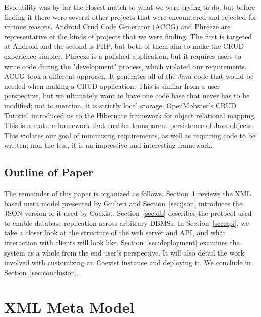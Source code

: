 \documentclass[journal]{IEEEtran}
\begin{document}
Evolutility\cite{giulieri_evolutility_????} was by far the closest match to what we were trying to do, but before finding it there were several other projects that were encountered and rejected for various reasons. Android Crud Code Generator (ACCG)\cite{popovski_android-crud-code-generator_????} and Phreeze\cite{hinkle_phreeze_????} are representative of the kinds of projects that we were finding. The first is targeted at Android and the second is PHP, but both of them aim to make the CRUD experience simpler. Phreeze is a polished application, but it requires users to write code during the "development" process, which violated our requirements. ACCG took a different approach. It generates all of the Java code that would be needed when making a CRUD application. This is similar from a user perspective, but we ultimately want to have one code base that never has to be modified; not to mention, it is strictly local storage. OpenMobster's CRUD Tutorial\cite{openmobster_mobilizehibernate_????} introduced us to the Hibernate framework\cite{jboss_community_hibernate_????} for object relational mapping. This is a mature framework that enables transparent persistence of Java objects. This violates our goal of minimizing requirements, as well as requiring code to be written; non the less, it is an impressive and interesting framework. 


\subsection{Outline of Paper} \label{sec:outline}


The remainder of this paper is organized as follows. Section~\ref{sec:xml} reviews the XML based meta model presented by Giulieri and Section~\ref{sec:json} introduces the JSON version of it used by Coexist. Section~\ref{sec:db} describes the protocol used to enable database replication across arbitrary DBMSs. In Section~\ref{sec:api}, we take a closer look at the structure of the web server and API, and what interaction with clients will look like. Section~\ref{sec:deployment} examines the system as a whole from the end user's perspective. It will also detail the work involved with customizing an Coexist instance and deploying it. We conclude in Section~\ref{sec:conclusion}.

\section{XML Meta Model} \label{sec:xml}
\end{document}
